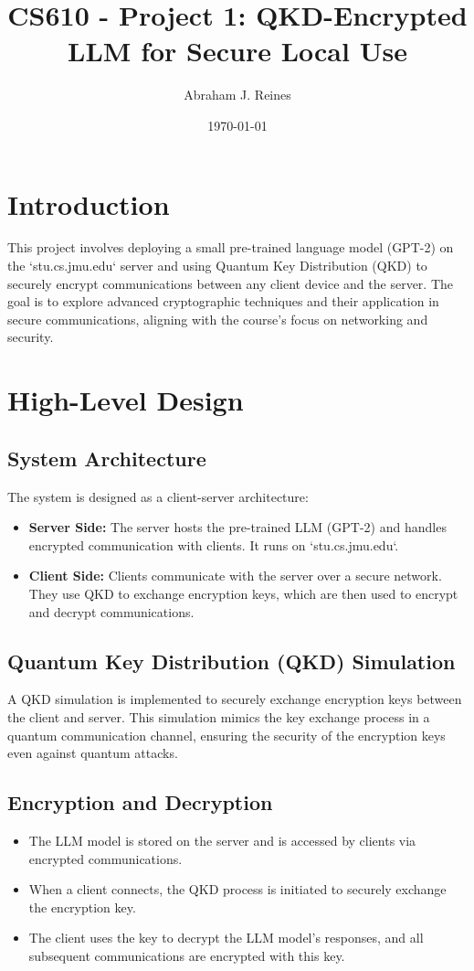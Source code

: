 \documentclass{article}
\title{CS610 - Project 1: QKD-Encrypted LLM for Secure Local Use}
\author{Abraham J. Reines}
\date{\today}
\begin{document}
\maketitle

\tableofcontents

\section{Introduction}
This project involves deploying a small pre-trained language model (GPT-2) on the `stu.cs.jmu.edu` server and using Quantum Key Distribution (QKD) to securely encrypt communications between any client device and the server. The goal is to explore advanced cryptographic techniques and their application in secure communications, aligning with the course's focus on networking and security.

\section{High-Level Design}

\subsection{System Architecture}
The system is designed as a client-server architecture:
\begin{itemize}
    \item \textbf{Server Side:} The server hosts the pre-trained LLM (GPT-2) and handles encrypted communication with clients. It runs on `stu.cs.jmu.edu`.
    \item \textbf{Client Side:} Clients communicate with the server over a secure network. They use QKD to exchange encryption keys, which are then used to encrypt and decrypt communications.
\end{itemize}

\subsection{Quantum Key Distribution (QKD) Simulation}
A QKD simulation is implemented to securely exchange encryption keys between the client and server. This simulation mimics the key exchange process in a quantum communication channel, ensuring the security of the encryption keys even against quantum attacks.

\subsection{Encryption and Decryption}
\begin{itemize}
    \item The LLM model is stored on the server and is accessed by clients via encrypted communications.
    \item When a client connects, the QKD process is initiated to securely exchange the encryption key.
    \item The client uses the key to decrypt the LLM model's responses, and all subsequent communications are encrypted with this key.
\end{itemize}
\end{document}
